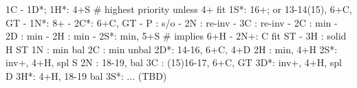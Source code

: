 1C - 1D*;
1H*: 4+S  # highest priority unless 4+ fit
1S*: 16+; or 13-14(15), 6+C, GT
   - 1N*: 8+
        - 2C*: 6+C, GT
             - P  : s/o
             - 2N : re-inv
             - 3C : re-inv
   - 2C : min
   - 2D : min
   - 2H : min
   - 2S*: min, 5+S  # implies 6+H
   - 2N+: C fit ST
   - 3H : solid H ST
1N : min bal
2C : min unbal
2D*: 14-16, 6+C, 4+D
2H : min, 4+H
2S*: inv+, 4+H, spl S
2N : 18-19, bal
3C : (15)16-17, 6+C, GT
3D*: inv+, 4+H, spl D
3H*: 4+H, 18-19 bal
3S*: ... (TBD)
